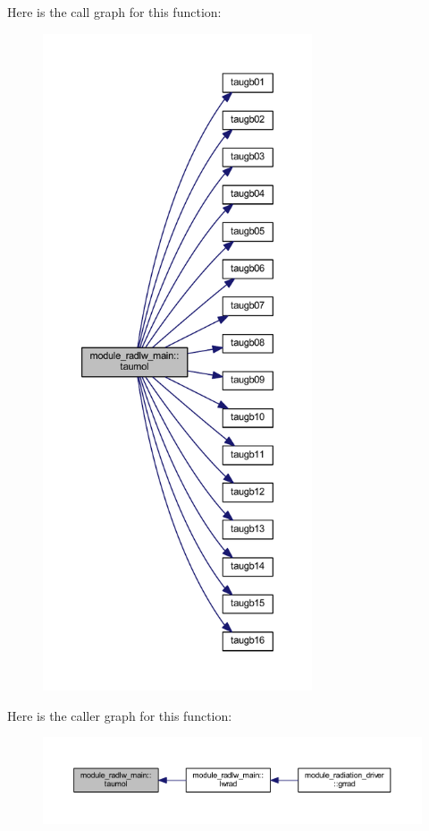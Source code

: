 Here is the call graph for this function\+:
\nopagebreak
\begin{figure}[H]
\begin{center}
\leavevmode
\includegraphics[height=550pt]{namespacemodule__radlw__main_a7025e0f49149cf0ddbdd175efb5fe986_cgraph}
\end{center}
\end{figure}




Here is the caller graph for this function\+:
\nopagebreak
\begin{figure}[H]
\begin{center}
\leavevmode
\includegraphics[width=350pt]{namespacemodule__radlw__main_a7025e0f49149cf0ddbdd175efb5fe986_icgraph}
\end{center}
\end{figure}




